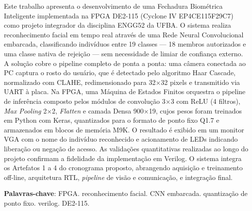 
\setlength{\absparsep}{18pt} %
\begin{resumo}
Este trabalho apresenta o desenvolvimento de uma Fechadura Biométrica Inteligente implementada na FPGA DE2-115 (Cyclone IV EP4CE115F29C7) como projeto integrador da disciplina ENGG52 da UFBA. O sistema realiza reconhecimento facial em tempo real através de uma Rede Neural Convolucional embarcada, classificando indivíduos entre 19 classes — 18 membros autorizados e uma classe nativa de rejeição — sem necessidade de limiar de confiança externo.
A solução cobre o pipeline completo de ponta a ponta: uma câmera conectada ao PC captura o rosto do usuário, que é detectado pelo algoritmo Haar Cascade, normalizado com CLAHE, redimensionado para 32×32 pixels e transmitido via UART à placa. Na FPGA, uma Máquina de Estados Finitos orquestra o pipeline de inferência composto pelos módulos de convolução 3×3 com ReLU (4 filtros), \textit{Max Pooling} 2×2, \textit{Flatten} e camada Densa 900×19, cujos pesos foram treinados em Python com Keras, quantizados para o formato de ponto fixo Q1.7 e armazenados em blocos de memória M9K. O resultado é exibido em um monitor VGA com o nome do indivíduo reconhecido e acionamento de LEDs indicando liberação ou negação de acesso.
As validações quantitativas realizadas ao longo do projeto confirmam a fidelidade da implementação em Verilog. O sistema integra os Artefatos 1 a 4 do cronograma proposto, abrangendo aquisição e treinamento off-line, arquitetura RTL, \textit{pipeline} de visão e comunicação, e integração final.


 \textbf{Palavras-chave}: FPGA. reconhecimento facial. CNN embarcada. quantização de ponto fixo. verilog. DE2-115.
\end{resumo}
